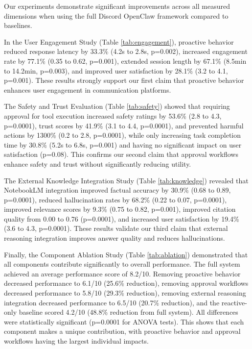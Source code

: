 Our experiments demonstrate significant improvements across all measured dimensions when using the full Discord OpenClaw framework compared to baselines.

In the User Engagement Study (Table \ref{tab:engagement}), proactive behavior reduced response latency by 33.3\% (4.2s to 2.8s, p=0.002), increased engagement rate by 77.1\% (0.35 to 0.62, p=0.001), extended session length by 67.1\% (8.5min to 14.2min, p=0.003), and improved user satisfaction by 28.1\% (3.2 to 4.1, p=0.001). These results strongly support our first claim that proactive behavior enhances user engagement in communication platforms.

The Safety and Trust Evaluation (Table \ref{tab:safety}) showed that requiring approval for tool execution increased safety ratings by 53.6\% (2.8 to 4.3, p=0.0001), trust scores by 41.9\% (3.1 to 4.4, p=0.0001), and prevented harmful actions by 1300\% (0.2 to 2.8, p=0.0001), while only increasing task completion time by 30.8\% (5.2s to 6.8s, p=0.001) and having no significant impact on user satisfaction (p=0.08). This confirms our second claim that approval workflows enhance safety and trust without significantly reducing utility.

The External Knowledge Integration Study (Table \ref{tab:knowledge}) revealed that NotebookLM integration improved factual accuracy by 30.9\% (0.68 to 0.89, p=0.0001), reduced hallucination rates by 68.2\% (0.22 to 0.07, p=0.0001), improved relevance scores by 9.3\% (0.75 to 0.82, p=0.001), improved citation quality from 0.00 to 0.76 (p=0.0001), and increased user satisfaction by 19.4\% (3.6 to 4.3, p=0.0001). These results validate our third claim that external reasoning integration improves answer quality and reduces hallucinations.

Finally, the Component Ablation Study (Table \ref{tab:ablation}) demonstrated that all components contribute significantly to overall performance. The full system achieved an average performance score of 8.2/10. Removing proactive behavior decreased performance to 6.1/10 (25.6\% reduction), removing approval workflows decreased performance to 5.8/10 (29.3\% reduction), removing external reasoning integration decreased performance to 6.5/10 (20.7\% reduction), and the reactive-only baseline scored 4.2/10 (48.8\% reduction from full system). All differences were statistically significant (p=0.0001 for ANOVA tests). This shows that each component makes a unique contribution, with proactive behavior and approval workflows having the largest individual impacts.